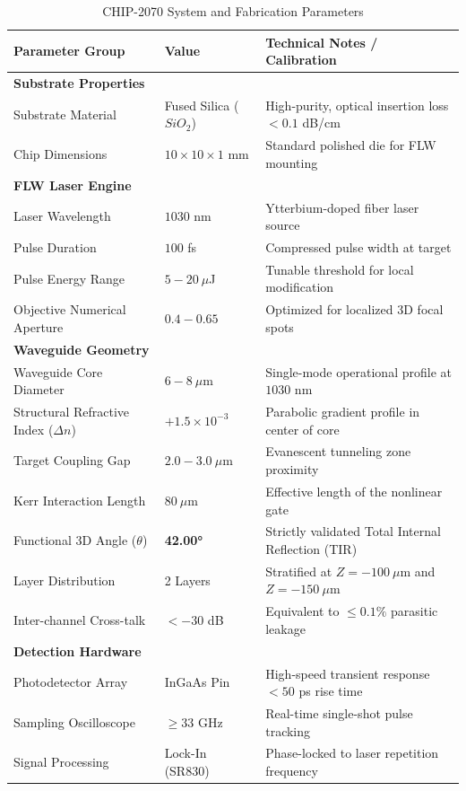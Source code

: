 \documentclass[11pt,a4paper]{article}
\begin{document}
\begin{table}[h!]
\centering
\caption{CHIP-2070 System and Fabrication Parameters}
\vspace{0.2cm}
\begin{tabular}{lll}
\toprule
\textbf{Parameter Group} & \textbf{Value} & \textbf{Technical Notes / Calibration} \\
\midrule
\textbf{Substrate Properties} & & \\
Substrate Material & Fused Silica ($SiO_2$) & High-purity, optical insertion loss $< 0.1$ dB/cm \\
Chip Dimensions & $10 \times 10 \times 1$ mm & Standard polished die for FLW mounting \\
\midrule
\textbf{FLW Laser Engine} & & \\
Laser Wavelength & $1030$ nm & Ytterbium-doped fiber laser source \\
Pulse Duration & $100$ fs & Compressed pulse width at target \\
Pulse Energy Range & $5 - 20\ \mu$J & Tunable threshold for local modification \\
Objective Numerical Aperture & $0.4 - 0.65$ & Optimized for localized 3D focal spots \\
\midrule
\textbf{Waveguide Geometry} & & \\
Waveguide Core Diameter & $6 - 8\ \mu$m & Single-mode operational profile at $1030$ nm \\
Structural Refractive Index ($\Delta n$) & $+1.5 \times 10^{-3}$ & Parabolic gradient profile in center of core \\
Target Coupling Gap & $2.0 - 3.0\ \mu$m & Evanescent tunneling zone proximity \\
Kerr Interaction Length & $80\ \mu$m & Effective length of the nonlinear gate \\
Functional 3D Angle ($\theta$) & \textbf{42.00°} & Strictly validated Total Internal Reflection (TIR) \\
Layer Distribution & 2 Layers & Stratified at $Z = -100\ \mu$m and $Z = -150\ \mu$m \\
Inter-channel Cross-talk & $< -30$ dB & Equivalent to $\le 0.1\%$ parasitic leakage \\
\midrule
\textbf{Detection Hardware} & & \\
Photodetector Array & InGaAs Pin & High-speed transient response $< 50$ ps rise time \\
Sampling Oscilloscope & $\ge 33$ GHz & Real-time single-shot pulse tracking \\
Signal Processing & Lock-In (SR830) & Phase-locked to laser repetition frequency \\
\bottomrule
\end{tabular}
\end{table}
\end{document}
